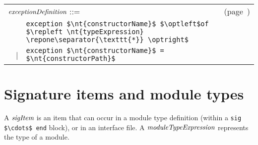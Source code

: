 \begin{center}
\begin{tabular}{rcll}
\multicolumn{3}{l}{$\textit{\rmfamily exceptionDefinition}$ ::=} & (page~\pageref{keyword:exception})\\
&   & \hbox{\lstinline/exception $\nt{constructorName}$ $\optleft$of $\repleft \nt{typeExpression} \repone\separator{\texttt{*}} \optright$/}\\
& | & \hbox{\lstinline/exception $\nt{constructorName}$ = $\nt{constructorPath}$/}
\end{tabular}
\end{center}

\newpage
\section{Signature items and module types}

A $\textit{\rmfamily sigItem}$ is an item that can occur in a module type definition (within a
\hbox{\lstinline/sig $\cdots$ end/} block), or in an interface file.  A $\textit{\rmfamily moduleTypeExpression}$ represents
the type of a module.

